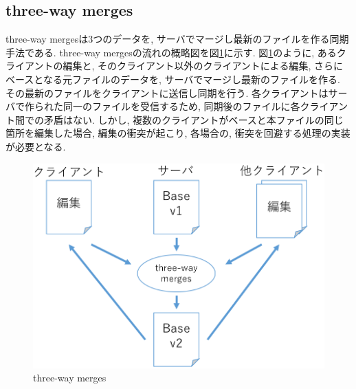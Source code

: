 \subsection{three-way merges}
three-way merges\cite{THREE}は3つのデータを, サーバでマージし最新のファイルを作る同期手法である. three-way mergesの流れの概略図を図\ref{threeway}に示す. 図\ref{threeway}のように, あるクライアントの編集と, そのクライアント以外のクライアントによる編集, さらにベースとなる元ファイルのデータを, サーバでマージし最新のファイルを作る. その最新のファイルをクライアントに送信し同期を行う. 各クライアントはサーバで作られた同一のファイルを受信するため, 同期後のファイルに各クライアント間での矛盾はない. しかし, 複数のクライアントがベースと本ファイルの同じ箇所を編集した場合, 編集の衝突が起こり, 各場合の, 衝突を回避する処理の実装が必要となる.
\begin{figure}[]
  \begin{center}
    \includegraphics[scale=0.3]{images/threeway}
    \caption{three-way merges}
    \label{threeway}
  \end{center}
\end{figure}
%
